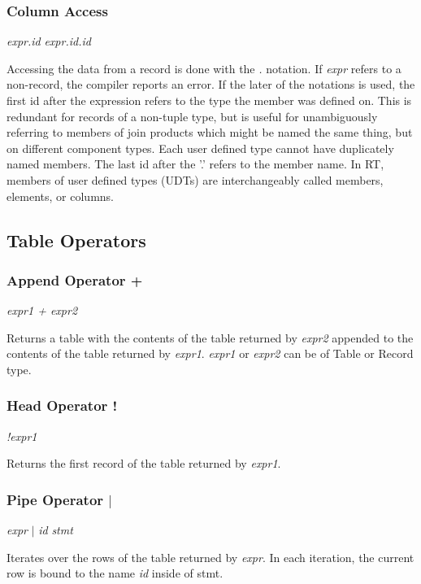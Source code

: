 \subsubsection{Column Access}
\begin{center}
\textsl{expr.id}
\textsl{expr.id.id}
\end{center}
Accessing the data from a record is done with the \textsl{.} notation. If \textsl{expr} refers to a non-record,
the compiler reports an error.  If the later of the notations is used, the first id after the expression refers to
the type the member was defined on.  This is redundant for records of a non-tuple type, but is useful for unambiguously
referring to members of join products which might be named the same thing, but on different component types.  
Each user defined type cannot have duplicately named members.  The last id after the '.' refers to the member name.  In
RT, members of user defined types (UDTs) are interchangeably called members, elements, or columns.

\subsection{Table Operators}

\subsubsection{Append Operator +}
\begin{center}
\textsl{expr1 + expr2}
\end{center}
Returns a table with the contents of the table returned by \textsl{expr2} appended to the contents of the table
returned by \textsl{expr1}. \textsl{expr1} or \textsl{expr2} can be of Table or Record type.

\subsubsection{Head Operator !}
\begin{center}
\textsl{!expr1}
\end{center}
Returns the first record of the table returned by \textsl{expr1}.

\subsubsection{Pipe Operator $|$}
\begin{center}
\textsl{expr} $|$ \textsl{id} \textsl{stmt}
\end{center}
Iterates over the rows of the table returned by \textsl{expr}.  In each iteration, the current row is bound to the
name \textsl{id} inside of stmt.

